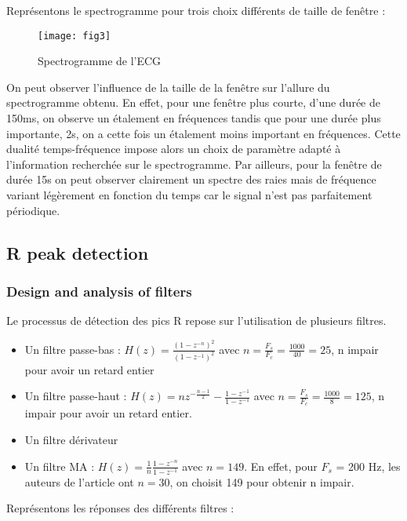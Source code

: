 \documentclass[12pt,a4paper,titlepage]{article}
\begin{document}
Représentons le spectrogramme pour trois choix différents de taille de fenêtre :

\begin{figure}[H]
    \caption{Spectrogramme de l'ECG}
    \texttt{[image: fig3]}
    \centering
\end{figure}

On peut observer l'influence de la taille de la fenêtre sur l'allure du spectrogramme obtenu.
En effet, pour une fenêtre plus courte, d'une durée de 150ms, on observe un étalement en fréquences tandis que
pour une durée plus importante, 2s, on a cette fois un étalement moins important en fréquences.
Cette dualité temps-fréquence impose alors un choix de paramètre adapté à l'information
recherchée sur le spectrogramme.
Par ailleurs, pour la fenêtre de durée 15s on peut observer clairement un spectre des raies mais de
fréquence variant légèrement en fonction du temps car le signal n'est pas parfaitement
périodique.

\subsection{R peak detection}

\subsubsection{Design and analysis of filters}

Le processus de détection des pics R repose sur l'utilisation de plusieurs filtres.

\begin{itemize}
    \item{Un filtre passe-bas : $H(z) = \frac{(1-z^{-n})^2}{(1-z^{-1})^2}$ avec
        $n = \frac{F_s}{F_c} = \frac{1000}{40} = 25$, n impair pour avoir un retard entier}
    \item{Un filtre passe-haut : $H(z) = nz^{-\frac{n-1}{2}} - \frac{1-z^{-1}}{1-z^{-1}}$
        avec $n = \frac{F_s}{F_c} =\frac{1000}{8} = 125$, n impair pour avoir un retard entier.}
    \item{Un filtre dérivateur}
    \item{Un filtre MA : $H(z) = \frac{1}{n} \frac{1-z^{-n}}{1-z^{-1}}$ avec 
            $n = 149$. En effet, pour $F_s$ = 200 Hz, les auteurs de l'article ont $n = 30$,
        on choisit 149 pour obtenir n impair.}
\end{itemize}

Représentons les réponses des différents filtres :
\end{document}
